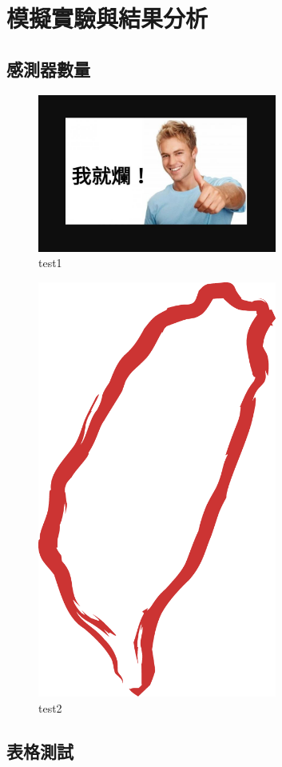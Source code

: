 \chapter{模擬實驗與結果分析}\label{Experimental_results}


\section{感測器數量}


\begin{figure}[H] 
    \centering 
    \includegraphics[width=0.7\textwidth]{./Figures/ImageTest/123.JPG} 
    \caption{test1} 
\end{figure}

\begin{figure}[H] 
    \centering 
    \includegraphics[width=0.7\textwidth]{./Figures/ImageTest/Taiwan_symbol.png} 
    \caption{test2} 
\end{figure}


\section{表格測試}


